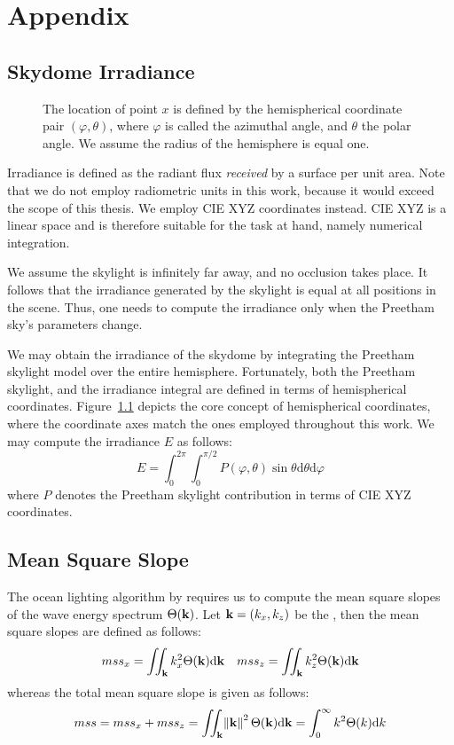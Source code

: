 \chapter{Appendix}
\section{Skydome Irradiance}
%
\begin{figure}
\centering
\def\svgwidth{0.5\textwidth}

\caption{The location of point $x$ is defined by the hemispherical coordinate
pair $(\varphi, \theta)$, where $\varphi$ is called the azimuthal angle, and
$\theta$ the polar angle. We assume the radius of the hemisphere
is equal one.}
\label{fig:hemispherical:coordinates}
\end{figure}
%
Irradiance is defined as the radiant flux \emph{received} by a surface per unit
area. Note that we do not employ radiometric units in this work, because it
would exceed the scope of this thesis. We employ CIE XYZ \citep{ciexyz:1931}
coordinates instead.
CIE XYZ is a linear space and is therefore suitable for the task at hand,
namely numerical integration.

We assume the skylight is infinitely far away, and no occlusion takes place.
It follows that the irradiance generated by the skylight is equal at all
positions in the scene.
Thus, one needs to compute the irradiance only when the Preetham sky's
parameters change.

We may obtain the irradiance of the skydome by integrating the
Preetham skylight model over the entire hemisphere. Fortunately, both the
Preetham skylight, and the irradiance integral are defined in terms of
hemispherical coordinates. Figure~\ref{fig:hemispherical:coordinates} depicts
the core concept of hemispherical coordinates, where the coordinate axes match
the ones employed throughout this work. We may compute the irradiance $E$ as
follows:
\begin{equation}
E = \int_{0}^{2\pi}\int_{0}^{\pi/2} P(\varphi,\theta) \sin{\theta}\mathrm{d}\theta\mathrm{d}\varphi
\end{equation}
where $P$ denotes the Preetham skylight contribution in terms of CIE XYZ coordinates.

%
%
\section{Mean Square Slope}
\label{app:mss}
%
The ocean lighting algorithm by \cite{misc:oceanlightingfft} requires us to compute
the mean square slopes of the wave energy spectrum $\Theta(\mathbf{k})$.
Let $\mathbf{k} = (k_x, k_z)$ be the \wavevector, then the mean square slopes
are defined as follows:
\begin{align}
mss_x = \iint_{\mathbf{k}} k_x^2 \Theta(\mathbf{k}) \mathrm{d}\mathbf{k} &&
mss_z = \iint_{\mathbf{k}} k_z^2 \Theta(\mathbf{k}) \mathrm{d}\mathbf{k}
\end{align}
%
whereas the total mean square slope is given as follows:
\begin{equation}
mss = mss_x + mss_z = \iint_{\mathbf{k}} \norm{\mathbf{k}}^2 \Theta(\mathbf{k}) \mathrm{d}\mathbf{k} = \int_{0}^{\infty}k^2 \Theta(k)\mathrm{d}k
\end{equation}